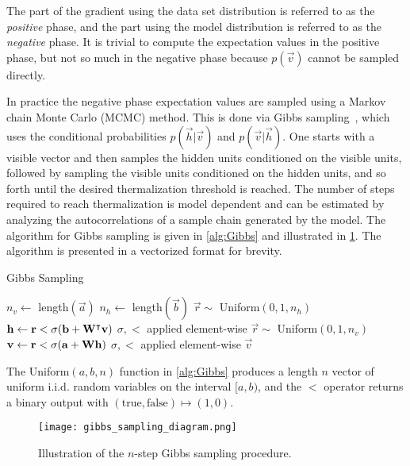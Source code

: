 The part of the gradient using the data set distribution is referred to as the \textit{positive} phase, and the part using the model distribution is referred to as the \textit{negative} phase.
It is trivial to compute the expectation values in the positive phase, but not so much in the negative phase because \( p(\vec{v}) \) cannot be sampled directly.

In practice the negative phase expectation values are sampled using a Markov chain Monte Carlo (MCMC) method.
This is done via Gibbs sampling~\cite{hinton_rbm_training}, which uses the conditional probabilities \( p(\vec{h}|\vec{v}) \) and \( p(\vec{v}|\vec{h}) \).
One starts with a visible vector and then samples the hidden units conditioned on the visible units, followed by sampling the visible units conditioned on the hidden units, and so forth until the desired thermalization threshold is reached.
The number of steps required to reach thermalization is model dependent and can be estimated by analyzing the autocorrelations of a sample chain generated by the model.
The algorithm for Gibbs sampling is given in \cref{alg:Gibbs} and illustrated in \cref{fig:gibbs_sampling_diagram}.
The algorithm is presented in a vectorized format for brevity.

\begin{algorithm}
\caption{Gibbs Sampling}
\begin{algorithmic}[1]
        \State $n_v \gets$ length$(\vec{a})$
        \State $n_h \gets$ length$(\vec{b})$
            \State $\vec{r} \sim$ Uniform$(0, 1, n_h)$
            \State $\mathbf{h} \gets \mathbf{r} < \sigma(\mathbf{b} + \mathbf{W}^\intercal\mathbf{v})$
                \Comment $\sigma, <$ applied element-wise
            \State $\vec{r} \sim$ Uniform$(0, 1, n_v)$
            \State $\mathbf{v} \gets \mathbf{r} < \sigma(\mathbf{a} + \mathbf{W}\mathbf{h})$
                \Comment $\sigma, <$ applied element-wise
        \EndFor
        \State \Return $\vec{v}$
    \EndProcedure
\end{algorithmic}
\label{alg:Gibbs}
\end{algorithm}
The Uniform$(a, b, n)$ function in \cref{alg:Gibbs} produces a length \( n \) vector of uniform i.i.d. random variables on the interval $[a, b)$, and the \( < \) operator returns a binary output with \( (\text{true}, \text{false}) \mapsto (1, 0) \).

\begin{figure}
    \begin{center}
        \texttt{[image: gibbs\_sampling\_diagram.png]}
    \end{center}
    \caption{Illustration of the \( n \)-step Gibbs sampling procedure.}
    \label{fig:gibbs_sampling_diagram}
\end{figure}

